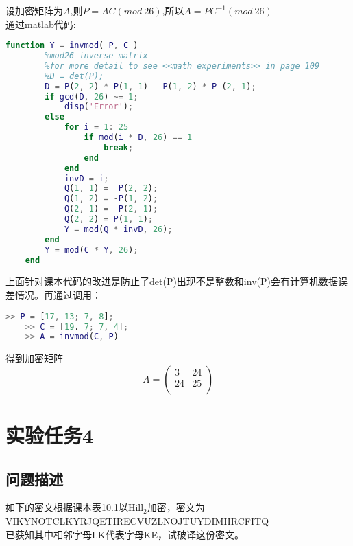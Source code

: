 \documentclass[12pt]{article}
\begin{document}
    设加密矩阵为$A$,则$P = AC(mod\ 26)$,所以$A = PC^{-1}(mod\ 26)$\\
    通过matlab代码:
    \begin{lstlisting}[language=MATLAB]
    function Y = invmod( P, C )
        %mod26 inverse matrix
        %for more detail to see <<math experiments>> in page 109
        %D = det(P);
        D = P(2, 2) * P(1, 1) - P(1, 2) * P (2, 1);
        if gcd(D, 26) ~= 1;
            disp('Error');
        else
            for i = 1: 25
                if mod(i * D, 26) == 1
                    break;
                end
            end
            invD = i;
            Q(1, 1) =  P(2, 2);
            Q(1, 2) = -P(1, 2);
            Q(2, 1) = -P(2, 1);
            Q(2, 2) = P(1, 1);
            Y = mod(Q * invD, 26);
        end
        Y = mod(C * Y, 26);
    end
    \end{lstlisting}
    上面针对课本代码的改进是防止了det(P)出现不是整数和inv(P)会有计算机数据误差情况。再通过调用：\\
    \begin{lstlisting}[language=MATLAB]
    >> P = [17, 13; 7, 8];
    >> C = [19. 7; 7, 4];
    >> A = invmod(C, P)
    \end{lstlisting}
    得到加密矩阵
    $$ A = 
        \begin{pmatrix}
            3 & 24\\
            24 & 25\\
        \end{pmatrix}
    $$
\section*{实验任务4}
    \subsection*{问题描述}
        如下的密文根据课本表10.1以Hill$_{2}$加密，密文为\\
        VIKYNOTCLKYRJQETIRECVUZLNOJTUYDIMHRCFITQ\\
        已获知其中相邻字母LK代表字母KE，试破译这份密文。\\
\end{document}
